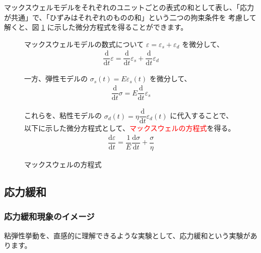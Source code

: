 \documentclass[uplatex,dvipdfmx,a4paper,11pt]{jsarticle}
\begin{document}
マックスウェルモデルをそれぞれのユニットごとの表式の和として表し、「応力が共通」で、「ひずみはそれぞれのものの和」という二つの拘束条件を
考慮して解くと、図 \ref{fig:maxwell_eq} に示した微分方程式を得ることができます。
\begin{figure}[htb]
	\begin{center}
		\begin{minipage}{0.9\textwidth}
			\begin{itembox}[l]{マックスウェルモデルの数式について}
				$\varepsilon = \varepsilon_s + \varepsilon_d$ を微分して、
				\begin{align*}
					\dfrac{\mathrm{d}}{\mathrm{d}t}\varepsilon = \dfrac{\mathrm{d}}{\mathrm{d}t}\varepsilon_s + \dfrac{\mathrm{d}}{\mathrm{d}t}\varepsilon_d
				\end{align*}
				
				一方、弾性モデルの $\sigma_s(t) = E \varepsilon_s(t)$ を微分して、
				\begin{align*}
					\dfrac{\mathrm{d}}{\mathrm{d}t}\sigma = E \dfrac{\mathrm{d}}{\mathrm{d}t}\varepsilon_s
				\end{align*}
		
				これらを、粘性モデルの $\sigma_d(t) = \eta \dfrac{\mathrm{d}}{\mathrm{d}t}\varepsilon_d(t)$ に代入することで、
				以下に示した微分方程式として、\textcolor{red}{マックスウェルの方程式}を得る。
				\color{red}
				\begin{align*}
					\dfrac{\mathrm{d}\varepsilon}{\mathrm{d}t} = \dfrac{1}{E} \dfrac{\mathrm{d}\sigma}{\mathrm{d}t} + \dfrac{\sigma}{\eta}
				\end{align*}
			\end{itembox}
		\end{minipage}
		\caption{マックスウェルの方程式}
		\label{fig:maxwell_eq}
	\end{center}
\end{figure}

\subsection{応力緩和}

\subsubsection{応力緩和現象のイメージ}
粘弾性挙動を、直感的に理解できるような実験として、応力緩和という実験があります。
\end{document}
